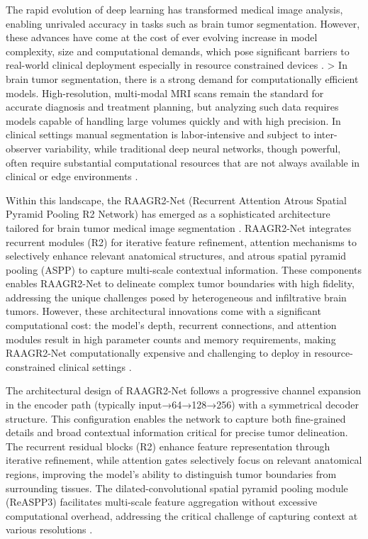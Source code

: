 \documentclass[12pt,a4paper]{article}
\begin{document}
The rapid evolution of deep learning has transformed medical image analysis, enabling unrivaled accuracy in tasks such as brain tumor segmentation. However, these advances have come at the cost of ever evolving increase in model complexity, size and computational demands, which pose significant barriers to real-world clinical deployment especially in resource constrained devices \cite{Yang2025, Mazurek2024, Wu2023, Ragab2024}. > In brain tumor segmentation, there is a strong demand for computationally efficient models. High-resolution, multi-modal MRI scans remain the standard for accurate diagnosis and treatment planning, but analyzing such data requires models capable of handling large volumes quickly and with high precision. In clinical settings manual segmentation is labor-intensive and subject to inter-observer variability, while traditional deep neural networks, though powerful, often require substantial computational resources that are not always available in clinical or edge environments \cite{Yang2025, Ragab2024}.

Within this landscape, the RAAGR2-Net (Recurrent Attention Atrous Spatial Pyramid Pooling R2 Network) has emerged as a sophisticated architecture tailored for brain tumor medical image segmentation \cite{Rehman2023RAAGR2}. RAAGR2-Net integrates recurrent modules (R2) for iterative feature refinement, attention mechanisms to selectively enhance relevant anatomical structures, and atrous spatial pyramid pooling (ASPP) to capture multi-scale contextual information. These components enables RAAGR2-Net to delineate complex tumor boundaries with high fidelity, addressing the unique challenges posed by heterogeneous and infiltrative brain tumors. However, these architectural innovations come with a significant computational cost: the model's depth, recurrent connections, and attention modules result in high parameter counts and memory requirements, making RAAGR2-Net computationally expensive and challenging to deploy in resource-constrained clinical settings \cite{Rehman2023RAAGR2, Wang2023Review, Mazurek2024}.

The architectural design of RAAGR2-Net follows a progressive channel expansion in the encoder path (typically input→64→128→256) with a symmetrical decoder structure. This configuration enables the network to capture both fine-grained details and broad contextual information critical for precise tumor delineation. The recurrent residual blocks (R2) enhance feature representation through iterative refinement, while attention gates selectively focus on relevant anatomical regions, improving the model's ability to distinguish tumor boundaries from surrounding tissues. The dilated-convolutional spatial pyramid pooling module (ReASPP3) facilitates multi-scale feature aggregation without excessive computational overhead, addressing the critical challenge of capturing context at various resolutions \cite{Rehman2023RAAGR2}.
\end{document}
